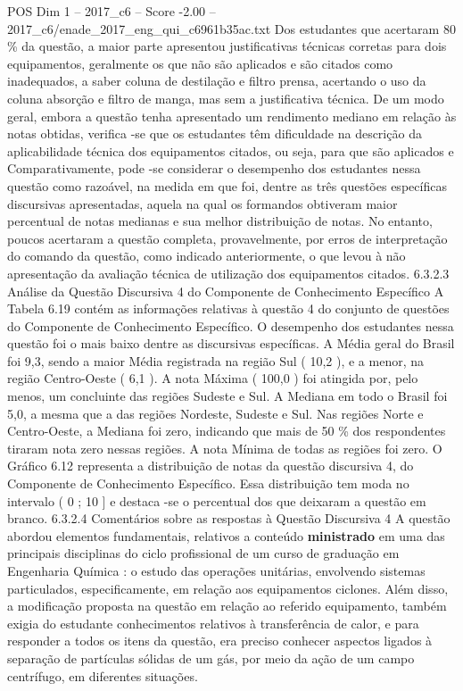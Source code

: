 \begin{textsample}{POS Dim 1 – 2017\_c6 – Score -2.00 – 2017\_c6/enade\_2017\_eng\_qui\_c6961b35ac.txt}
Dos estudantes que acertaram 80 \% da questão, a maior parte apresentou justificativas técnicas corretas para dois equipamentos, geralmente os que não são aplicados e são citados como inadequados, a saber coluna de destilação e filtro prensa, acertando o uso da coluna absorção e filtro de manga, mas sem a justificativa técnica.
De um modo geral, embora a questão tenha apresentado um rendimento mediano em relação às notas obtidas, verifica -se que os estudantes têm dificuldade na descrição da aplicabilidade técnica dos equipamentos citados, ou seja, para que são aplicados e Comparativamente, pode -se considerar o desempenho dos estudantes nessa questão como razoável, na medida em que foi, dentre as três questões específicas discursivas apresentadas, aquela na qual os formandos obtiveram maior percentual de notas medianas e sua melhor distribuição de notas.
No entanto, poucos acertaram a questão completa, provavelmente, por erros de interpretação do comando da questão, como indicado anteriormente, o que levou à não apresentação da avaliação técnica de utilização dos equipamentos citados. 6.3.2.3 Análise da Questão Discursiva 4 do Componente de Conhecimento Específico A Tabela 6.19 contém as informações relativas à questão 4 do conjunto de questões do Componente de Conhecimento Específico.
O desempenho dos estudantes nessa questão foi o mais baixo dentre as discursivas específicas.
A Média geral do Brasil foi 9,3, sendo a maior Média registrada na região Sul ( 10,2 ), e a menor, na região Centro-Oeste ( 6,1 ).
A nota Máxima ( 100,0 ) foi atingida por, pelo menos, um concluinte das regiões Sudeste e Sul.
A Mediana em todo o Brasil foi 5,0, a mesma que a das regiões Nordeste, Sudeste e Sul.
Nas regiões Norte e Centro-Oeste, a Mediana foi zero, indicando que mais de 50 \% dos respondentes tiraram nota zero nessas regiões.
A nota Mínima de todas as regiões foi zero.
O Gráfico 6.12 representa a distribuição de notas da questão discursiva 4, do Componente de Conhecimento Específico.
Essa distribuição tem moda no intervalo ( 0 ; 10 ] e destaca -se o percentual dos que deixaram a questão em branco. 6.3.2.4 Comentários sobre as respostas à Questão Discursiva 4 A questão abordou elementos fundamentais, relativos a conteúdo \textbf{ministrado} em uma das principais disciplinas do ciclo profissional de um curso de graduação em Engenharia Química : o estudo das operações unitárias, envolvendo sistemas particulados, especificamente, em relação aos equipamentos ciclones.
Além disso, a modificação proposta na questão em relação ao referido equipamento, também exigia do estudante conhecimentos relativos à transferência de calor, e para responder a todos os itens da questão, era preciso conhecer aspectos ligados à separação de partículas sólidas de um gás, por meio da ação de um campo centrífugo, em diferentes situações.

\end{textsample}
